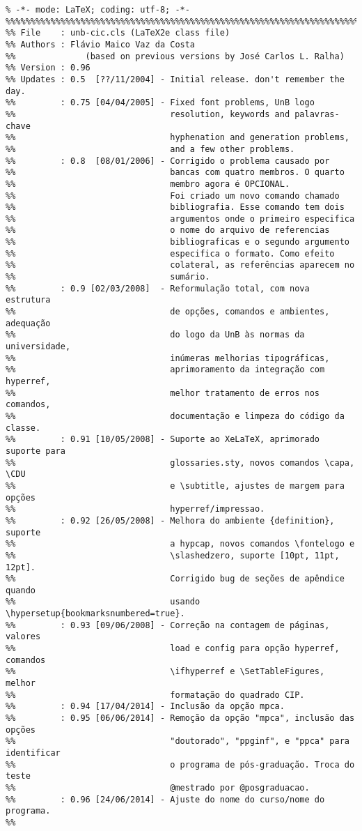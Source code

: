 \small\begin{verbatim}
% -*- mode: LaTeX; coding: utf-8; -*-
%%%%%%%%%%%%%%%%%%%%%%%%%%%%%%%%%%%%%%%%%%%%%%%%%%%%%%%%%%%%%%%%%%%%%%%%%%%%%%%
%% File    : unb-cic.cls (LaTeX2e class file)
%% Authors : Flávio Maico Vaz da Costa
%%              (based on previous versions by José Carlos L. Ralha)
%% Version : 0.96
%% Updates : 0.5  [??/11/2004] - Initial release. don't remember the day.
%%         : 0.75 [04/04/2005] - Fixed font problems, UnB logo
%%                               resolution, keywords and palavras-chave
%%                               hyphenation and generation problems,
%%                               and a few other problems.
%%         : 0.8  [08/01/2006] - Corrigido o problema causado por
%%                               bancas com quatro membros. O quarto
%%                               membro agora é OPCIONAL.
%%                               Foi criado um novo comando chamado
%%                               bibliografia. Esse comando tem dois
%%                               argumentos onde o primeiro especifica
%%                               o nome do arquivo de referencias
%%                               bibliograficas e o segundo argumento
%%                               especifica o formato. Como efeito
%%                               colateral, as referências aparecem no
%%                               sumário.
%%         : 0.9 [02/03/2008]  - Reformulação total, com nova estrutura
%%                               de opções, comandos e ambientes, adequação
%%                               do logo da UnB às normas da universidade,
%%                               inúmeras melhorias tipográficas,
%%                               aprimoramento da integração com hyperref,
%%                               melhor tratamento de erros nos comandos,
%%                               documentação e limpeza do código da classe.
%%         : 0.91 [10/05/2008] - Suporte ao XeLaTeX, aprimorado suporte para
%%                               glossaries.sty, novos comandos \capa, \CDU
%%                               e \subtitle, ajustes de margem para opções
%%                               hyperref/impressao.
%%         : 0.92 [26/05/2008] - Melhora do ambiente {definition}, suporte
%%                               a hypcap, novos comandos \fontelogo e
%%                               \slashedzero, suporte [10pt, 11pt, 12pt].
%%                               Corrigido bug de seções de apêndice quando
%%                               usando \hypersetup{bookmarksnumbered=true}.
%%         : 0.93 [09/06/2008] - Correção na contagem de páginas, valores
%%                               load e config para opção hyperref, comandos
%%                               \ifhyperref e \SetTableFigures, melhor
%%                               formatação do quadrado CIP. 
%%         : 0.94 [17/04/2014] - Inclusão da opção mpca. 
%%         : 0.95 [06/06/2014] - Remoção da opção "mpca", inclusão das opções
%%                               "doutorado", "ppginf", e "ppca" para identificar
%%                               o programa de pós-graduação. Troca do teste 
%%                               @mestrado por @posgraduacao.
%%         : 0.96 [24/06/2014] - Ajuste do nome do curso/nome do programa.
%%
\end{verbatim}

